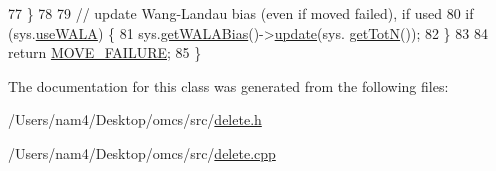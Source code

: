 \begin{DoxyCode}
77     \}
78     
79                 \textcolor{comment}{// update Wang-Landau bias (even if moved failed), if used}
80                 \textcolor{keywordflow}{if} (sys.\hyperlink{classsim_system_aa83b00006b3919fb6e13f1bdeadece6a}{useWALA}) \{
81                                 sys.\hyperlink{classsim_system_a7cb5049de8b0988349e89e30e4000407}{getWALABias}()->\hyperlink{classwala_a5eb2622be6a9e89f5e59ba0b15aca4bd}{update}(sys.
      \hyperlink{classsim_system_a37dd827f4057049763351510147b9f1d}{getTotN}());
82                 \}
83                                 
84                 \textcolor{keywordflow}{return} \hyperlink{moves_8h_a9832cf5fcfa8c0894545b591c9908e39}{MOVE\_FAILURE};
85 \}
\end{DoxyCode}


The documentation for this class was generated from the following files\+:\begin{DoxyCompactItemize}
\item 
/\+Users/nam4/\+Desktop/omcs/src/\hyperlink{delete_8h}{delete.\+h}\item 
/\+Users/nam4/\+Desktop/omcs/src/\hyperlink{delete_8cpp}{delete.\+cpp}\end{DoxyCompactItemize}
